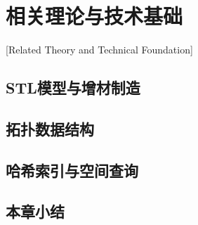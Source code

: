 
\chapter{相关理论与技术基础}[Related Theory and Technical Foundation]


\section{STL模型与增材制造}

\section{拓扑数据结构}

\section{哈希索引与空间查询}

\section{本章小结}
